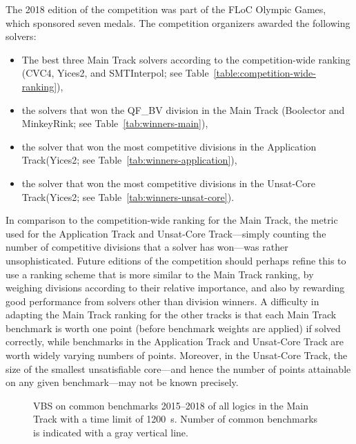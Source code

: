 \documentclass[dvipsnames,table,twoside,11pt]{article}
\newcommand{\maintrack}{Main Track\xspace}
\newcommand{\apptrack}{Application Track\xspace}
\newcommand{\ucoretrack}{Unsat-Core Track\xspace}
\begin{document}
The 2018 edition of the competition was part of the FLoC Olympic
Games, which sponsored seven medals.  The competition organizers
awarded the following solvers:
\begin{itemize}
\item The best three \maintrack solvers according to the
  competition-wide ranking (CVC4, Yices2, and SMTInterpol; see
  Table~\ref{table:competition-wide-ranking}),
\item the solvers that won the QF\_BV division in the \maintrack
  (Boolector and MinkeyRink; see Table~\ref{tab:winners-main}),
\item the solver that won the most competitive divisions in the
  \apptrack (Yices2; see Table~\ref{tab:winners-application}),
\item the solver that won the most competitive divisions in the
  \ucoretrack (Yices2; see Table~\ref{tab:winners-unsat-core}).
\end{itemize}

In comparison to the competition-wide ranking for the \maintrack, the
metric used for the \apptrack and \ucoretrack---simply counting
the number of competitive divisions that a solver has won---was rather
unsophisticated.  Future editions of the competition should perhaps
refine this to use a ranking scheme that is more similar to the
\maintrack ranking, by weighing divisions according to their relative
importance, and also by rewarding good performance from solvers other
than division winners.  A difficulty in adapting the \maintrack
ranking for the other tracks is that each \maintrack benchmark is
worth one point (before benchmark weights are applied) if solved
correctly, while benchmarks in the \apptrack and \ucoretrack
are worth widely varying numbers of points.  Moreover, in the
\ucoretrack, the size of the smallest unsatisfiable core---and
hence the number of points attainable on any given benchmark---may not
be known precisely.


\begin{figure}
  \centering
  \caption{VBS on common benchmarks 2015--2018 of all logics in the
    \maintrack with a time limit of \SI{1200}{s}.  Number of common
    benchmarks is indicated with a gray vertical line.}
  \label{fig:progress-all}
\end{figure}
\end{document}
